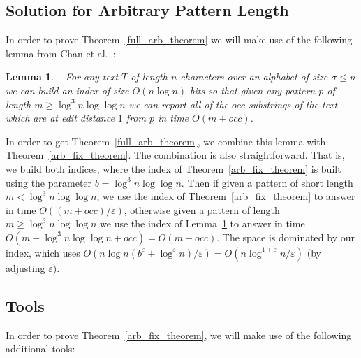 \documentclass{article}
\newcommand{\?}{\mskip1.5mu}
\renewcommand{\epsilon}{\varepsilon}
\newtheorem{lemma}{Lemma}
\begin{document}
\subsection{Solution for Arbitrary Pattern Length}
\label{section:full_arb_solution}
In order to prove Theorem~\ref{full_arb_theorem} we will make use of the following lemma from Chan et al.~\cite{chan2011linear}: 
\begin{lemma}~\cite[Section 2.3,Theorem 6]{chan2011linear}
\label{CLSTW06b1_fix_theorem}
For any text $T$ of length $n$ characters over an alphabet of size $\sigma\leq n$ we can build an index of size $O(n\log n)$ bits so that given any pattern $p$ of length $m\geq \log^3 n\log\log n$ we can report all of the $occ$ substrings of the text which are at edit distance $1$ from $p$ in time $O(m+occ)$. 
\end{lemma}
In order to get Theorem~\ref{full_arb_theorem}, we combine this lemma with Theorem~\ref{arb_fix_theorem}. 
The combination is also straightforward. That is, we build both indices, where the index of Theorem~\ref{arb_fix_theorem} is built using the parameter $b=\log^3 n\log\log n$. Then if given a pattern of short length $m<\log^3 n\log\log n$, we use the index of Theorem~\ref{arb_fix_theorem} to answer in time $O((m+occ)/\epsilon)$, otherwise given a pattern of length $m\geq \log^3 n\log\log n$ we use the index of Lemma~\ref{CLSTW06b1_fix_theorem} to answer in time $O(m+\log^3 n\log\log n+occ)=O(m+occ)$. The space is dominated by our index, which uses $O(n\log n(b^\epsilon+\log^\epsilon n)/\epsilon)=O(n\log^{1+\epsilon}n/\epsilon)$ (by adjusting $\epsilon$).
\subsection{Tools}
\label{section:arb_tools}
In order to prove Theorem~\ref{arb_fix_theorem}, we will make use of the following additional tools:
\end{document}
